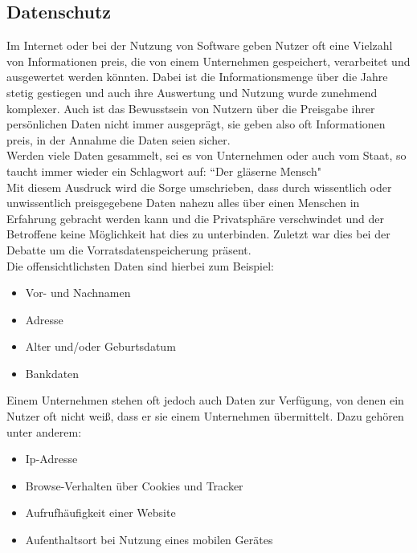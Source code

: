 \documentclass[a4paper, 12pt]{article}
\begin{document}
\subsection{Datenschutz}\label{datenschutz_kap}

Im Internet oder bei der Nutzung von Software geben Nutzer oft eine Vielzahl von Informationen preis, die von einem Unternehmen gespeichert, verarbeitet und ausgewertet werden könnten. Dabei ist die Informationsmenge über die Jahre stetig gestiegen und auch ihre Auswertung und Nutzung wurde zunehmend komplexer. Auch ist das Bewusstsein von Nutzern über die Preisgabe ihrer persönlichen Daten nicht immer ausgeprägt, sie geben also oft Informationen preis, in der Annahme die Daten seien sicher.\\
Werden viele Daten gesammelt, sei es von Unternehmen oder auch vom Staat, so taucht immer wieder ein Schlagwort auf: ``Der gläserne Mensch"\\
Mit diesem Ausdruck wird die Sorge umschrieben, dass durch wissentlich oder unwissentlich preisgegebene Daten nahezu alles über einen Menschen in Erfahrung gebracht werden kann und die Privatsphäre verschwindet und der Betroffene keine Möglichkeit hat dies zu unterbinden. Zuletzt war dies bei der Debatte um die Vorratsdatenspeicherung präsent.\\

\noindent Die offensichtlichsten Daten sind hierbei zum Beispiel:
\begin{itemize}
\item Vor- und Nachnamen
\item Adresse 
\item Alter und/oder Geburtsdatum
\item Bankdaten
\end{itemize}

\newpage
\noindent 
Einem Unternehmen stehen oft jedoch auch Daten zur Verfügung, von denen ein Nutzer oft nicht weiß, dass er sie einem Unternehmen übermittelt. Dazu gehören unter anderem:
\begin{itemize}
\item Ip-Adresse
\item Browse-Verhalten über Cookies und Tracker
\item Aufrufhäufigkeit einer Website
\item Aufenthaltsort bei Nutzung eines mobilen Gerätes
\end{itemize}
\end{document}
